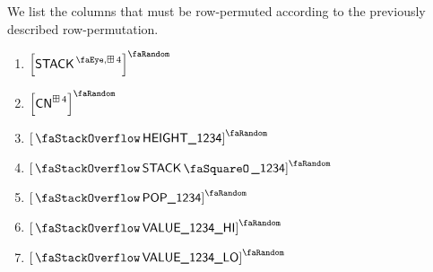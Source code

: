 We list the columns that must be row-permuted according to the previously described row-permutation.
\begin{multicols}{3}
	\begin{enumerate}
		\item $\order{\peekStackFour}$
		\item $\order{\cn^{\cc4}}$
		\item $\order{\stackItemHeight{\col{1234}}}$
		\item $\order{\stackItemStamp{\col{1234}}}$
		\item $\order{\stackItemPop{\col{1234}}}$
		\item $\order{\stackItemValHi{\col{1234}}}$
		\item $\order{\stackItemValLo{\col{1234}}}$
	\end{enumerate}
\end{multicols}

